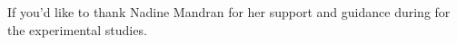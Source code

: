 

\begin{acknowledgements}
If you'd like to thank Nadine Mandran for her support and guidance during for the experimental studies.
\end{acknowledgements}


%
%







